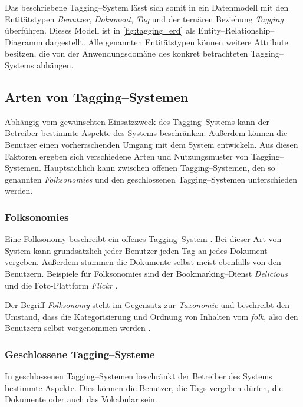 Das beschriebene Tagging--System lässt sich somit in ein Datenmodell mit den Entitätstypen \emph{Benutzer}, \emph{Dokument}, \emph{Tag} und  der ternären Beziehung \emph{Tagging} überführen. Dieses Modell ist in \cref{fig:tagging_erd} als Entity--Relationship--Diagramm dargestellt. Alle genannten Entitätstypen können weitere Attribute besitzen, die von der Anwendungsdomäne des konkret betrachteten Tagging--Systems abhängen.

\subsection{Arten von Tagging--Systemen}
\label{tagging_types}

Abhängig vom gewünschten Einsatzzweck des Tagging--Systems kann der Betreiber bestimmte Aspekte des Systems beschränken. Außerdem können die Benutzer einen vorherrschenden Umgang mit dem System entwickeln. Aus diesen Faktoren ergeben sich verschiedene Arten und Nutzungsmuster von Tagging--Systemen. Hauptsächlich kann zwischen offenen Tagging--Systemen, den so genannten \emph{Folksonomies} und den geschlossenen Tagging--Systemen unterschieden werden.

\subsubsection{Folksonomies}

Eine Folksonomy beschreibt ein offenes Tagging--System \cite{ma2004}. Bei dieser Art von System kann grundsätzlich jeder Benutzer jeden Tag an jedes Dokument vergeben. Außerdem stammen die Dokumente selbst meist ebenfalls von den Benutzern. Beispiele für Folksonomies sind der Bookmarking--Dienst \emph{Delicious} \cite{deli} und die Foto-Plattform \emph{Flickr} \cite{flickr}.

Der Begriff \emph{Folksonomy} steht im Gegensatz zur \emph{Taxonomie} und beschreibt den Umstand, dass die Kategorisierung und Ordnung von Inhalten vom \emph{folk}, also den Benutzern selbst vorgenommen werden \cite{vt2007}.

\subsubsection{Geschlossene Tagging--Systeme}

In geschlossenen Tagging--Systemen beschränkt der Betreiber des Systems bestimmte Aspekte. Dies können die Benutzer, die Tags vergeben dürfen, die Dokumente oder auch das Vokabular sein.

